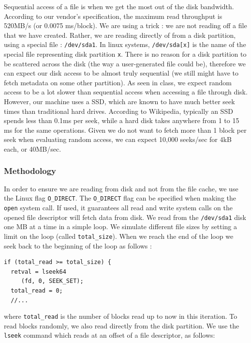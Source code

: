 Sequential access of a file is when we get the most out of the disk bandwidth. According to our vendor's specification, the maximum read throughput is 520MB/s (or 0.0075 ms/block). We are using a trick : we are not reading off a file that we have created. Rather, we are reading directly of from a disk partition, using a special file : \texttt{/dev/sda1}. In linux systems, \texttt{/dev/sda[x]} is the name of the special file representing disk partition \texttt{x}. There is no reason for a disk partition to be scattered across the disk (the way a user-generated file could be), therefore we can expect our disk access to be almost truly sequential (we still might have to fetch metadata on some other partition). As seen in class, we expect random access to be a lot slower than sequential access when accessing a file through disk. However, our machine uses a SSD, which are known to have much better seek times than traditional hard drives. According to Wikipedia, typically an SSD spends less than 0.1ms per seek, while a hard disk takes anywhere from 1 to 15 ms for the same operations. Given we do not want to fetch more than 1 block per seek when evaluating random access, we can expect 10,000 seeks/sec for 4kB each, or 40MB/sec. 

\subsubsection{Methodology}

In order to ensure we are reading from disk and not from the file cache, we use the Linux flag \texttt{O\_DIRECT}. The \texttt{O\_DIRECT} flag can be specified when making the \texttt{open} system call. If used, it guarantees all read and write system calls on the opened file descriptor will fetch data from disk. We read from the \texttt{/dev/sda1} disk one MB at a time in a simple loop. We simulate different file sizes by setting a limit on the loop (called \texttt{total\_size}). When we reach the end of the loop we seek back to the beginning of the loop as follows : 

\begin{lstlisting}
if (total_read >= total_size) {
  retval = lseek64
     (fd, 0, SEEK_SET);
  total_read = 0;
  //...
\end{lstlisting}

where \texttt{total\_read} is the number of blocks read up to now in this iteration. To read blocks randomly, we also read directly from the disk partition. We use the \texttt{lseek} command which reads at an offset of a file descriptor, as follows:

